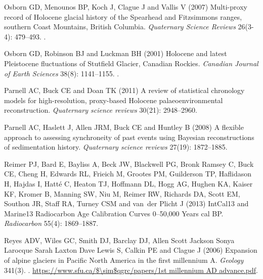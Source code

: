 \documentclass[Royal,times,doublespace,sageh]{sagej}
\begin{document}
\begin{thebibliography}{68}
{
Osborn GD, Menounos BP, Koch J, Clague J and Vallis V (2007) {Multi-proxy
  record of Holocene glacial history of the Spearhead and Fitzsimmons ranges,
  southern Coast Mountains, British Columbia}.
\newblock \emph{Quaternary Science Reviews} 26(3-4): 479--493.
\newblock {}.

Osborn GD, Robinson BJ and Luckman BH (2001) {Holocene and latest Pleistocene
  fluctuations of Stutfield Glacier, Canadian Rockies}.
\newblock \emph{Canadian Journal of Earth Sciences} 38(8): 1141--1155.
\newblock {}.

Parnell AC, Buck CE and Doan TK (2011) {A review of statistical chronology
  models for high-resolution, proxy-based Holocene palaeoenvironmental
  reconstruction}.
\newblock \emph{Quaternary science reviews} 30(21): 2948--2960.

Parnell AC, Haslett J, Allen JRM, Buck CE and Huntley B (2008) {A flexible
  approach to assessing synchroneity of past events using Bayesian
  reconstructions of sedimentation history}.
\newblock \emph{Quaternary science reviews} 27(19): 1872--1885.

Reimer PJ, Bard E, Bayliss A, Beck JW, Blackwell PG, {Bronk Ramsey} C, Buck CE,
  Cheng H, Edwards RL, Frieich M, Grootes PM, Guilderson TP, Haflidason H,
  Hajdas I, Hatt{\'{e}} C, Heaton TJ, Hoffmann DL, Hogg AG, Hughen KA, Kaiser
  KF, Kromer B, Manning SW, Niu M, Reimer RW, Richards DA, Scott EM, Southon
  JR, Staff RA, Turney CSM and van~der Plicht J (2013) {IntCal13 and Marine13
  Radiocarbon Age Calibration Curves 0–50,000 Years cal BP}.
\newblock \emph{Radiocarbon} 55(4): 1869--1887.

Reyes ADV, Wiles GC, Smith DJ, Barclay DJ, {Allen Scott Jackson Sonya Larocque
  Sarah Laxton Dave Lewis} S, Calkin PE and Clague J (2006) {Expansion of
  alpine glaciers in Pacific North America in the first millennium A}.
\newblock \emph{Geology} 341(3).
\newblock {}.
\newblock \urlprefix\url{https://www.sfu.ca/$\sim$qgrc/papers/1st millennium AD
  advance.pdf}.

}
\end{thebibliography}
\end{document}
